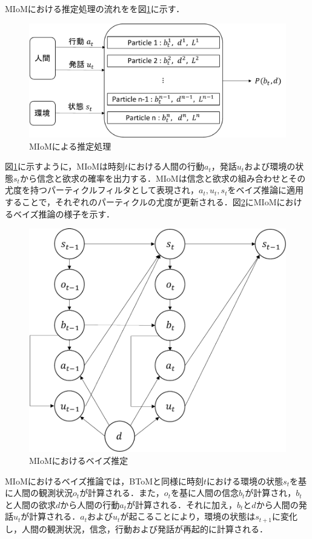\par
MIoMにおける推定処理の流れをを図\ref{fig:sys_arc}に示す．
\begin{figure}[htbp]
  \begin{center}
    \includegraphics[scale=0.85]{./bt1.pdf}
    \caption{MIoMによる推定処理}
    \label{fig:sys_arc}
  \end{center}
\end{figure}
図\ref{fig:sys_arc}に示すように，MIoMは時刻$t$における人間の行動$a_t$，発話$u_t$および環境の状態$s_t$から信念と欲求の確率を出力する．MIoMは信念と欲求の組み合わせとその尤度を持つパーティクルフィルタとして表現され，$a_t,u_t,s_t$をベイズ推論に適用することで，それぞれのパーティクルの尤度が更新される．図\ref{fig:miom}にMIoMにおけるベイズ推論の様子を示す．
\begin{figure}[htbp]
  \begin{center}
    \includegraphics[scale=0.85]{./miom.pdf}
    \caption{MIoMにおけるベイズ推定}
    \label{fig:miom}
  \end{center}
\end{figure}
MIoMにおけるベイズ推論では，BToMと同様に時刻$t$における環境の状態$s_{t}$を基に人間の観測状況$o_{t}$が計算される．また，$o_{t}$を基に人間の信念$b_{t}$が計算され，$b_{t}$と人間の欲求$d$から人間の行動$a_{t}$が計算される．それに加え，$b_t$と$d$から人間の発話$u_t$が計算される．$a_{t}$および$u_t$が起こることにより，環境の状態は$s_{t+1}$に変化し，人間の観測状況，信念，行動および発話が再起的に計算される．
